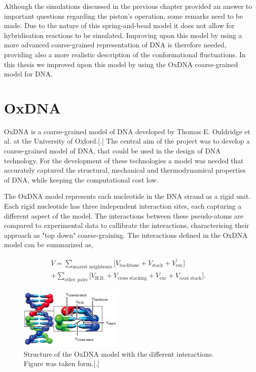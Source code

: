 \vspace{1cm}
Although the simulations discussed in the previous chapter provided an answer to
important questions regarding the piston's operation, some remarks need to be made. Due
to the nature of this spring-and-bead model it does not allow for hybridisation reactions
to be simulated. Improving upon this model by using a more advanced coarse-grained
representation of DNA is therefore needed, providing also a more realistic description of
the conformational fluctuations. In this thesis we improved upon this model by using the
OxDNA coarse-grained model for DNA.\\


\section{OxDNA}


OxDNA is a coarse-grained model of DNA developed by Thomas E. Ouldridge et al. at the
University of Oxford.[.] The central aim of the project was to develop a coarse-grained
model of DNA, that could be used in the design of DNA technology. For the development of
these technologies a model was needed that accurately captured the structural, mechanical
and thermodynamical properties of DNA, while keeping the computational cost low.

The OxDNA model represents each nucleotide in the DNA strand as a rigid unit. Each rigid
nucleotide has three independent interaction sites, each capturing a different aspect of
the model. The interactions between these pseudo-atoms are compared to experimental
data to callibrate the interactions, characterising their approach as "top down"
coarse-graining. The interactions defined in the OxDNA model can be summarized as,

\begin{equation}
  \begin{aligned}
    V = \sum_{\text{nearest neighbours}} \bigg[ V_{\text{backbone}} + V_{\text{stack}} +
    V^{'}_{\text{exc}}\bigg]\\
    + \sum_{\text{other pairs}} \bigg[V_{\text{H.B.}} + V_{\text{cross stacking}} +
    V_{\text{exc}} + V_{\text{coax stack}}\bigg].
  \end{aligned}
\end{equation}

\begin{figure}
  \begin{center}
    \includegraphics[width=0.45\textwidth]{Figures/oxDNA_model.png}
  \end{center}
  \caption{Structure of the OxDNA model with the different interactions.
  Figure was taken form.[.]}
\end{figure}

